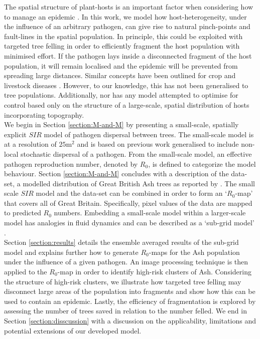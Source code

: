 The spatial structure of plant-hosts is an important factor when considering how to manage an epidemic \cite{spatial-control-optimisation, control-heterogeneous-landscapes}. In this work, we model how host-heterogeneity, under the influence of an arbitrary pathogen, can give rise to natural pinch-points and fault-lines in the spatial population. In principle, this could be exploited with targeted tree felling in order to efficiently fragment the host population with minimised effort. If the pathogen lays inside a disconnected fragment of the host population, it will remain localised and the epidemic will be prevented from spreading large distances. Similar concepts have been outlined for crop and livestock diseases \cite{PAPAIX201435, GILIOLI20131, Gilligan-disease-management}. However, to our knowledge, this has not been generalised to tree populations. Additionally, nor has any model attempted to optimise for control based only on the structure of a large-scale, spatial distribution of hosts incorporating topography.\\

We begin in Section \ref{section:M-and-M} by presenting a small-scale, spatially explicit $SIR$ model of pathogen dispersal between trees. The small-scale model is at a resolution of $25\mathrm{m^2}$ and is based on previous work \cite{OROZCOFUENTES201912} generalised to include non-local stochastic dispersal of a pathogen. From the small-scale model, an effective pathogen reproduction number, denoted by $R_0$, is defined to categorize the model behaviour. Section \ref{section:M-and-M} concludes with a description of the data-set, a modelled distribution of Great British Ash trees as reported by \cite{hill.data}. The small scale $SIR$ model and the data-set can be combined in order to form an `$R_0$-map' that covers all of Great Britain. Specifically, pixel values of the data are mapped to predicted $R_0$ numbers. Embedding a small-scale model within a larger-scale model has analogies in fluid dynamics and can be described as a `sub-grid model' \cite{sub-grid}.\\

Section \ref{section:results} details the ensemble averaged results of the sub-grid model and explains further how to generate $R_0$-maps for the Ash population under the influence of a given pathogen. An image processing technique is then applied to the $R_0$-map in order to identify high-risk clusters of Ash. Considering the structure of high-risk clusters, we illustrate how targeted tree felling may disconnect large areas of the population into fragments and show how this can be used to contain an epidemic. Lastly, the efficiency of fragmentation is explored by assessing the number of trees saved in relation to the number felled. We end in Section \ref{section:disscussion} with a discussion on the applicability, limitations and potential extensions of our developed model.

